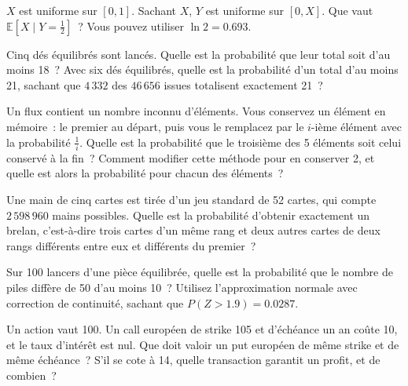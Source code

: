 
\begin{question}\label{iq:iv1:timed-test-10:7}
$X$ est uniforme sur $[0, 1]$. Sachant $X$, $Y$ est uniforme sur $[0, X]$. Que vaut $\mathbb{E}[X \mid Y = \frac12]$~? Vous pouvez utiliser $\ln 2 = 0.693$.
\end{question}

\begin{question}\label{iq:iv1:timed-test-10:8}
Cinq dés équilibrés sont lancés. Quelle est la probabilité que leur total soit d'au moins 18~? Avec six dés équilibrés, quelle est la probabilité d'un total d'au moins 21, sachant que $4\,332$ des $46\,656$ issues totalisent exactement 21~?
\end{question}

\begin{question}\label{iq:iv1:timed-test-10:9}
Un flux contient un nombre inconnu d'éléments. Vous conservez un élément en mémoire~: le premier au départ, puis vous le remplacez par le $i$-ième élément avec la probabilité $\frac1i$. Quelle est la probabilité que le troisième des 5 éléments soit celui conservé à la fin~? Comment modifier cette méthode pour en conserver 2, et quelle est alors la probabilité pour chacun des éléments~?
\end{question}

\begin{question}\label{iq:iv1:timed-test-10:10}
Une main de cinq cartes est tirée d'un jeu standard de 52 cartes, qui compte $2\,598\,960$ mains possibles. Quelle est la probabilité d'obtenir exactement un brelan, c'est-à-dire trois cartes d'un même rang et deux autres cartes de deux rangs différents entre eux et différents du premier~?
\end{question}

\begin{question}\label{iq:iv1:timed-test-10:11}
Sur 100 lancers d'une pièce équilibrée, quelle est la probabilité que le nombre de piles diffère de 50 d'au moins 10~? Utilisez l'approximation normale avec correction de continuité, sachant que $P(Z > 1.9) = 0.0287$.
\end{question}

\begin{question}\label{iq:iv1:timed-test-10:12}
Un action vaut 100. Un call européen de strike 105 et d'échéance un an coûte 10, et le taux d'intérêt est nul. Que doit valoir un put européen de même strike et de même échéance~? S'il se cote à 14, quelle transaction garantit un profit, et de combien~?
\end{question}
